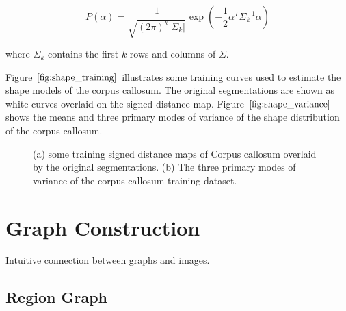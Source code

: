 \documentclass{SMBV12}
\begin{document}
\begin{equation}
P(\alpha) = \dfrac{1}{\sqrt{(2\pi)^k |\Sigma_k|}} \exp\left( -\dfrac{1}{2} \alpha^T \Sigma^{-1}_k \alpha \right) 
\end{equation}

where $\Sigma_k$ contains the first $k$ rows and columns of $\Sigma$.

Figure $\ref{fig:shape_training}$ illustrates some training curves used to estimate the shape models of the corpus callosum. The original segmentations are shown as white curves overlaid on the signed-distance map. Figure $\ref{fig:shape_variance}$ shows the means and three primary modes of variance of the shape distribution of the corpus callosum.

\begin{figure}[htbp]
    \centering
    \caption{(a) some training signed distance maps of Corpus callosum overlaid by the original segmentations. (b) The three primary modes of variance of the corpus callosum training dataset.}
\end{figure}

\section{Graph Construction}

Intuitive connection between graphs and images.

\subsection{Region Graph}
\end{document}
